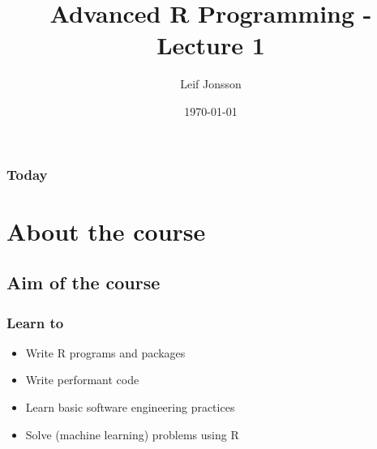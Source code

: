 \documentclass{beamer}
\title[Lecture 1]{Advanced R Programming - Lecture 1} %
\author{Leif Jonsson} %
\institute[STIMA] %
{
Link\"{o}ping University \\ %
\medskip
\textit{leif.jonsson@ericsson.com\\leif.r.jonsson@liu.se} %
}
\date{\today} %
\begin{document}
\begin{frame}
\titlepage %
\end{frame}

\begin{frame}
\frametitle{Today} %
\tableofcontents %
\end{frame}


\section{About the course} %

\subsection{Aim of the course} %

\begin{frame}
\frametitle{Learn to}
\begin{itemize}
\item Write R programs and packages
\item Write performant code
\item Learn basic software engineering practices
\item Solve (machine learning) problems using R
\end{itemize}
\end{frame}
\end{document}
